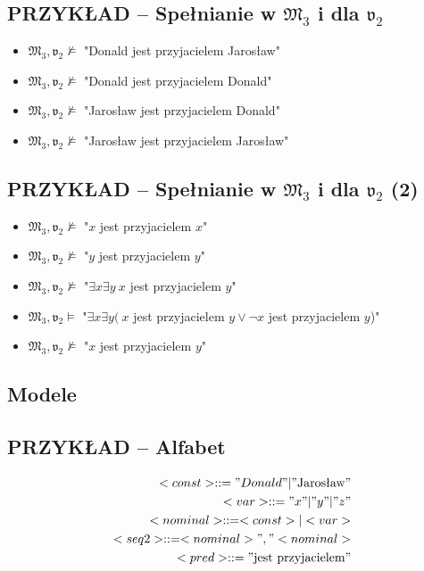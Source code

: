 \documentclass[12pt]{article}
\begin{document}
\subsection{PRZYKŁAD -- Spełnianie w $\mathfrak{M}_3$ i dla $\mathfrak{v}_2$}
%
\begin{itemize}
\item $\mathfrak{M}_3,\mathfrak{v}_2 \not \vDash$ "Donald jest przyjacielem Jarosław"%
\item $\mathfrak{M}_3,\mathfrak{v}_2 \not \vDash$ "Donald jest przyjacielem Donald"%
\item $\mathfrak{M}_3,\mathfrak{v}_2 \not \vDash$ "Jarosław jest przyjacielem Donald"%
\item $\mathfrak{M}_3,\mathfrak{v}_2 \not \vDash$ "Jarosław jest przyjacielem Jarosław"
\end{itemize}
%

\subsection{PRZYKŁAD -- Spełnianie w $\mathfrak{M}_3$ i dla $\mathfrak{v}_2$ (2)}
%
\begin{itemize}
\item $\mathfrak{M}_3,\mathfrak{v}_2 \not \vDash$ "$x$ jest przyjacielem $x$"%
\item $\mathfrak{M}_3,\mathfrak{v}_2 \not \vDash$ "$y$ jest przyjacielem $y$"%
\item $\mathfrak{M}_3,\mathfrak{v}_2 \not \vDash$ "$\exists x \exists y ~x$ jest przyjacielem $y$"%
\item $\mathfrak{M}_3,\mathfrak{v}_2 \vDash$ "$\exists x \exists y ( ~x$ jest przyjacielem $y \lor \neg x$ jest przyjacielem $y$)"%
\item $\mathfrak{M}_3,\mathfrak{v}_2 \not \vDash$ "$x$ jest przyjacielem $y$"
\end{itemize}
%


\subsection{Modele}
%

\subsection{PRZYKŁAD -- Alfabet}
%
\begin{eqnarray}
<const> ::= "Donald" | "\text{Jarosław}" \\ %
<var> ::= "x" | "y" | "z" \\ %
<nominal> ::= <const> | <var> \\ %
<seq2> ::= <nominal>","<nominal> \\ %
<pred> ::= "\text{jest przyjacielem}"
\end{eqnarray}
%
\end{document}
